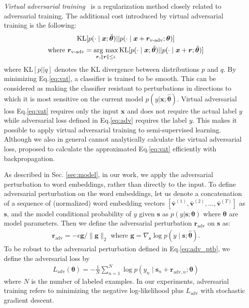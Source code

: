 \documentclass{article}
\newcommand{\vx}{{\bm{x}}}
\newcommand{\vg}{{\bm{g}}}
\newcommand{\vv}{\bm{v}}
\newcommand{\vs}{\bm{s}}
\newcommand{\vr}{\bm{r}}
\newcommand{\vtheta}{\bm{\theta}}
\newcommand{\argmax}{\mathop{\rm arg~max}\limits}
\begin{document}
\emph{Virtual adversarial training}~\cite[]{miyato2015distributional} is a
regularization method closely related to adversarial training. The additional cost introduced by
virtual adversarial training is the following:
\begin{gather}
  {\mathrm{KL}}[p(\cdot \mid \vx; \hat{\vtheta})|| p(\cdot \mid \vx+\vr_{\rm v\text{-}adv}; \vtheta)] \label{eq:vat} \\
	{\rm where}\ \vr_{\rm v\text{-}adv} = \argmax_{\vr,\|\vr\| \leq \epsilon}
 {\mathrm{KL}}[p(\cdot \mid \vx; \hat{\vtheta})|| p(\cdot \mid \vx+\vr; \hat{\vtheta})] 
\end{gather}
where ${\mathrm{KL}}[p||q]$ denotes the KL divergence between distributions $p$ and $q$.
By minimizing Eq.\eqref{eq:vat}, a classifier is trained to be smooth. This can
be considered as making the classifier resistant to perturbations in
directions to which it is most sensitive on the current model $p(y|\vx;
\hat{\vtheta})$.
Virtual adversarial loss Eq.\eqref{eq:vat} requires only the input $\vx$ and does not
require the actual label $y$ while adversarial loss defined in Eq.\eqref{eq:adv} requires the label $y$.
This makes it possible to apply virtual adversarial training to semi-supervised learning.
Although we also in general cannot analytically calculate the virtual adversarial loss,
\citet{miyato2015distributional} proposed to calculate the approximated
Eq.\eqref{eq:vat} efficiently with backpropagation.

As described in Sec. \ref{sec:model}, in our work, we apply the adversarial perturbation to word embeddings,
rather than directly to the input.
To define adversarial perturbation on the word embeddings, let us denote a concatenation
of a sequence of (normalized) word embedding vectors $[\bar{\vv}^{(1)}, \bar{\vv}^{(2)}, \dots, \bar{\vv}^{(T)}]$ as $\vs$,
and the model conditional probability of $y$ given $\vs$ as $p(y|\vs; \vtheta)$
where $\vtheta$ are model parameters.
Then we define the adversarial perturbation $\vr_{\mathrm{adv}}$ on $\vs$ as:
\begin{align}
	\vr_{\mathrm{adv}} = -\epsilon {\vg} / {\| \vg \|_2 } \text{ where } \vg = \nabla_{\vs} \log p(y \mid \vs; \hat{\vtheta}) \label{eq:adv_ptb}.	
\end{align}
To be robust to the adversarial perturbation defined in Eq.\eqref{eq:adv_ptb}, we 
define the adversarial loss by  
\begin{align}
	L_{\mathrm{adv}}(\vtheta) = - \frac{1}{N} \sum_{n=1}^{N} \log p(y_n \mid
	\vs_n + \vr_{{\mathrm{adv}},n}; \vtheta) \label{eq:adv_loss}  
\end{align}
where $N$ is the number of labeled examples.
In our experiments, adversarial training refers to minimizing the negative
log-likelihood plus $L_{\mathrm{adv}}$ with stochastic
gradient descent.
\end{document}
